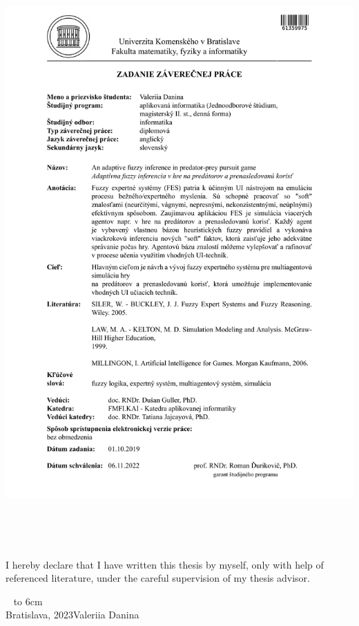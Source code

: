 \documentclass[12pt, twoside, openany]{book}
\def\mfauthor{Valeriia Danina}
\def\mfplacedate{Bratislava, 2023}
\begin{document}
\newpage 
\thispagestyle{empty}
\hspace{-2cm}\includegraphics[page=2,width=1.1\textwidth]{zadaniePrace.PDF}



{~}\vspace{12cm}

\noindent
\begin{minipage}{0.25\textwidth}~\end{minipage}
\thispagestyle{empty}
\begin{minipage}{0.75\textwidth}
I hereby declare that I have written this thesis by myself, only with help of referenced literature, under the careful supervision of my thesis advisor.
\newline \newline
\end{minipage}
\vfill
~ \hfill {\hbox to 6cm{\dotfill}} \\
\mfplacedate \hfill \mfauthor
\vfill\eject \cleardoublepage
\end{document}
